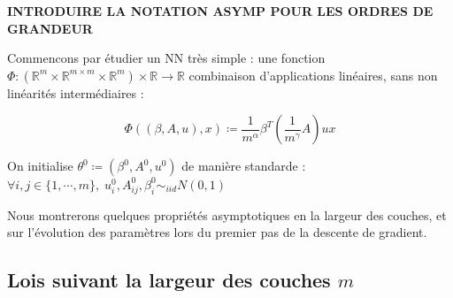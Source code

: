 \documentclass[a4paper, 11pt, french]{article}
\theoremstyle{definition}
\begin{document}
	{\bf INTRODUIRE LA NOTATION ASYMP POUR LES ORDRES DE GRANDEUR}
	
	Commencons par étudier un NN très simple : une fonction
	$\Phi : (\mathbb{R}^m \times \mathbb{R}^{m \times m} \times \mathbb{R}^m) \times \mathbb{R} \to \mathbb{R}$ combinaison d'applications linéaires, sans non linéarités  intermédiaires  :
	
	\[ \Phi ((\beta, A, u), x) \coloneqq \frac{1}{m^{\alpha}} \beta^T
		 \left( \frac{1}{m^{\gamma}} A \right) u x \]
		 
	On initialise $\theta^0 \coloneqq (\beta^0, A^0, u^0)$ de manière standarde : 
	$ \forall i,j \in \{1, \cdots, m\} , \; u_i^0, A_{ij}^0, \beta_i^0 \sim_{iid} N(0, 1)$
	
	Nous montrerons quelques propriétés asymptotiques en la largeur des couches, et sur l'évolution des paramètres lors du premier pas de la descente de gradient.
	
	\subsection{Lois suivant la largeur des couches $m$}
	
\end{document}
